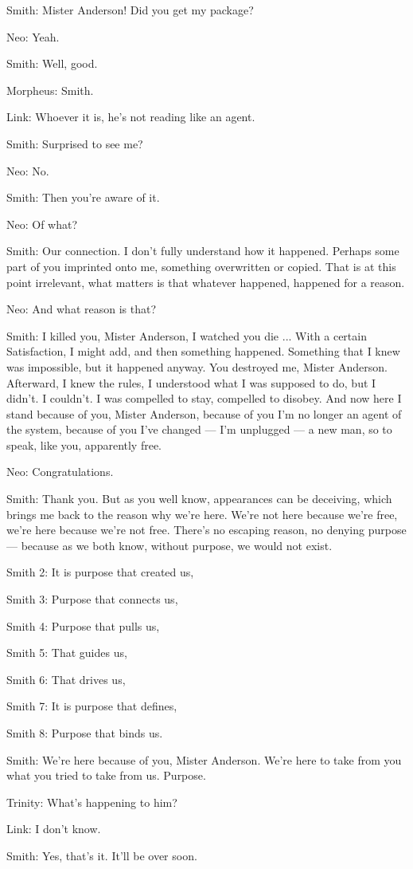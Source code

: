 \documentclass{ctexart}
\newenvironment{myquote}{\color{green} \setlength{\leftskip}{6em} \setlength{\rightskip}{4em} \setlength{\parindent}{-2em}}{\par}
\begin{document}
\begin{myquote}
Smith: Mister Anderson! Did you get my package?

Neo: Yeah.

Smith: Well, good.

Morpheus: Smith.

Link: Whoever it is, he's not reading like an agent.

Smith: Surprised to see me?

Neo: No.

Smith: Then you're aware of it.

Neo: Of what?

Smith: Our connection. I don't fully understand how it happened. Perhaps some part of you imprinted onto me, something overwritten or copied. That is at this point irrelevant, what matters is that whatever happened, happened for a reason.

Neo: And what reason is that?

Smith: I killed you, Mister Anderson, I watched you die ... With a certain Satisfaction, I might add, and then something happened. Something that I knew was impossible, but it happened anyway. You destroyed me, Mister Anderson. Afterward, I knew the rules, I understood what I was supposed to do, but I didn't. I couldn't. I was compelled to stay, compelled to disobey. And now here I stand because of you, Mister Anderson, because of you I'm no longer an agent of the system, because of you I've changed --- I'm unplugged --- a new man, so to speak, like you, apparently free.

Neo: Congratulations.

Smith: Thank you. But as you well know, appearances can be deceiving, which brings me back to the reason why we're here. We're not here because we're free, we're here because we're not free. There's no escaping reason, no denying purpose --- because as we both know, without purpose, we would not exist.

Smith 2: It is purpose that created us,

Smith 3: Purpose that connects us,

Smith 4: Purpose that pulls us,

Smith 5: That guides us,

Smith 6: That drives us,

Smith 7: It is purpose that defines,

Smith 8: Purpose that binds us.

Smith: We're here because of you, Mister Anderson. We're here to take from you what you tried to take from us. Purpose.

Trinity: What's happening to him?

Link: I don't know.

Smith: Yes, that's it. It'll be over soon.
\end{myquote}
\end{document}
